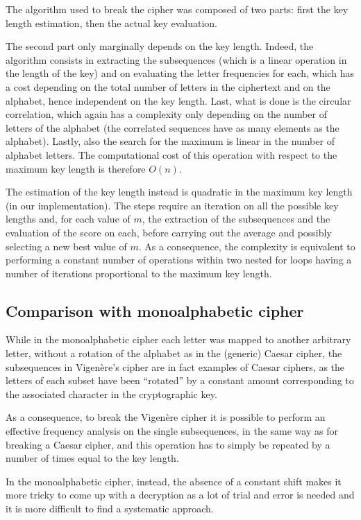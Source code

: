 \documentclass[12pt]{article}
\begin{document}
The algorithm used to break the cipher was composed of two parts: first the key length estimation, then the actual key evaluation.

The second part only marginally depends on the key length. Indeed, the algorithm consists in extracting the subsequences (which is a linear operation in the length of the key) and on evaluating the letter frequencies for each, which has a cost depending on the total number of letters in the ciphertext and on the alphabet, hence independent on the key length.
Last, what is done is the circular correlation, which again has a complexity only depending on the number of letters of the alphabet (the correlated sequences have as many elements as the alphabet). Lastly, also the search for the maximum is linear in the number of alphabet letters.
The computational cost of this operation with respect to the maximum key length is therefore $O(n)$.

The estimation of the key length instead is quadratic in the maximum key length (in our implementation).
The steps require an iteration on all the possible key lengths and, for each value of $m$, the extraction of the subsequences and the evaluation of the score on each, before carrying out the average and possibly selecting a new best value of $m$.
As a consequence, the complexity is equivalent to performing a constant number of operations within two nested for loops having a number of iterations proportional to the maximum key length.

\subsection{Comparison with monoalphabetic cipher}

While in the monoalphabetic cipher each letter was mapped to another arbitrary letter, without a rotation of the alphabet as in the (generic) Caesar cipher, the subsequences in Vigenère's cipher are in fact examples of Caesar ciphers, as the letters of each subset have been ``rotated'' by a constant amount corresponding to the associated character in the cryptographic key.

As a consequence, to break the Vigenère cipher it is possible to perform an effective frequency analysis on the single subsequences, in the same way as for breaking a Caesar cipher, and this operation has to simply be repeated by a number of times equal to the key length.

In the monoalphabetic cipher, instead, the absence of a constant shift makes it more tricky to come up with a decryption as a lot of trial and error is needed and it is more difficult to find a systematic approach.
\end{document}
